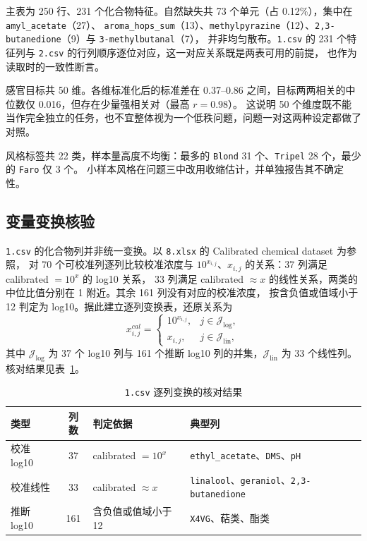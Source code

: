 ﻿\documentclass[UTF8,a4paper,zihao=-4]{ctexart}
\numberwithin{figure}{section}
\numberwithin{table}{section}
\numberwithin{equation}{section}
\newcommand{\file}[1]{\texttt{#1}}
\newcommand{\Jcal}{\mathcal{J}}
\begin{document}
主表为 250 行、231 个化合物特征。自然缺失共 73 个单元（占 0.12\%），集中在 \file{amyl\_acetate}（27）、
\file{aroma\_hops\_sum}（13）、\file{methylpyrazine}（12）、\file{2,3-butanedione}（9）与 \file{3-methylbutanal}（7），
并非均匀散布。\file{1.csv} 的 231 个特征列与 \file{2.csv} 的行列顺序逐位对应，这一对应关系既是两表可用的前提，
也作为读取时的一致性断言。

感官目标共 50 维。各维标准化后的标准差在 0.37--0.86 之间，目标两两相关的中位数仅 0.016，但存在少量强相关对（最高 $r=0.98$）。
这说明 50 个维度既不能当作完全独立的任务，也不宜整体视为一个低秩问题，问题一对这两种设定都做了对照。

风格标签共 22 类，样本量高度不均衡：最多的 \file{Blond} 31 个、\file{Tripel} 28 个，最少的 \file{Faro} 仅 3 个。
小样本风格在问题三中改用收缩估计，并单独报告其不确定性。

\subsection{变量变换核验}

\file{1.csv} 的化合物列并非统一变换。以 \file{8.xlsx} 的 Calibrated chemical dataset 为参照，
对 70 个可校准列逐列比较校准浓度与 $10^{x_{i,j}}$、$x_{i,j}$ 的关系：37 列满足 calibrated $=10^{x}$ 的 log10 关系，
33 列满足 calibrated $\approx x$ 的线性关系，两类的中位比值分别在 1 附近。其余 161 列没有对应的校准浓度，
按含负值或值域小于 12 判定为 log10。据此建立逐列变换表，还原关系为
\begin{equation}
x^{cal}_{i,j}=
\begin{cases}
10^{x_{i,j}}, & j\in\Jcal_{\log},\\
x_{i,j}, & j\in\Jcal_{\mathrm{lin}},
\end{cases}
\label{eq:untransform}
\end{equation}
其中 $\Jcal_{\log}$ 为 37 个 log10 列与 161 个推断 log10 列的并集，$\Jcal_{\mathrm{lin}}$ 为 33 个线性列。
核对结果见表~\ref{tab:transform}。

\begin{table}[H]
  \centering
  \caption{\file{1.csv} 逐列变换的核对结果}
  \label{tab:transform}
  \small
  \begin{tabularx}{\textwidth}{@{}l c >{\hsize=1.15\hsize\raggedright\arraybackslash}X >{\hsize=0.85\hsize\raggedright\arraybackslash}X@{}}
    \toprule
    类型 & 列数 & 判定依据 & 典型列 \\
    \midrule
    校准 log10 & 37 & calibrated $=10^{x}$ & \file{ethyl\_acetate}、\file{DMS}、\file{pH} \\
    校准线性 & 33 & calibrated $\approx x$ & \file{linalool}、\file{geraniol}、\file{2,3-butanedione} \\
    推断 log10 & 161 & 含负值或值域小于 12 & \file{X4VG}、萜类、酯类 \\
    \bottomrule
  \end{tabularx}
\end{table}
\end{document}

